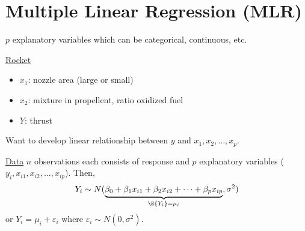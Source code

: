 \section{Multiple Linear Regression (MLR)}
$ p $ explanatory variables which can be categorical,
continuous, etc.

\underline{Rocket}
\begin{itemize}
    \item $ x_1 $: nozzle area (large or small)
    \item $ x_2 $: mixture in propellent, ratio oxidized fuel
    \item $ Y $: thrust
\end{itemize}
Want to develop linear relationship between $ y $
and $ x_1,x_2,\ldots,x_p $.

\underline{Data}
$ n $ observations each consists of
response and $ p $ explanatory variables ($ y_i , x_{i1},x_{i2},\ldots,x_{ip} $).
Then,
\[ Y_i \sim N(
    \underbrace{\beta_0+\beta_1x_{i1}+
        \beta_2x_{i2}+\cdots +\beta_p x_{ip}}_{\E{Y_i}=
        \mu_i},\sigma^2) \]
or $ Y_i=\mu_i+\varepsilon_i $ where $ \varepsilon_i \sim N(0,\sigma^2) $.

